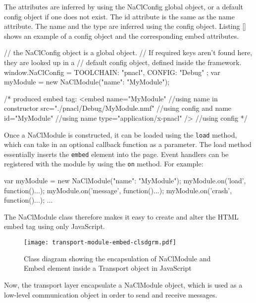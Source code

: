 The attributes are inferred by using the NaClConfig global object, or a default config object if one does not exist. The id attribute is the same as the name attribute. The name and the type are inferred using the config object. Listing \ref{} shows an example of a config object and the corresponding embed attributes.

\begin{code}
// the NaClConfig object is a global object. 
// If required keys aren't found here, they are looked up in a 
// default config object, defined inside the framework.
window.NaClConfig = {
  TOOLCHAIN: "pnacl",
  CONFIG: "Debug"
};
var myModule = new NaClModule({"name": "MyModule"});

/* produced embed tag:
<embed name="MyModule"                   //using name in constructor
       src="./pnacl/Debug/MyModule.nmf"  //using config and name
       id="MyModule"                     //using name
       type="application/x-pnacl" />     //using config
*/
\end{code}

Once a NaClModule is constructed, it can be loaded using the \lstinline{load} method, which can take in an optional callback function as a parameter. The load method essentially inserts the \lstinline{embed} element into the page. Event handlers can be registered with the module by using the \lstinline{on} method. For example:

\begin{code}
var myModule = new NaClModule({"name": "MyModule"});
myModule.on('load', function(){...});
myModule.on('message', function(){...});
myModule.on('crash', function(){...});
...
\end{code}

The NaClModule class therefore makes it easy to create and alter the HTML embed tag using only JavaScript. 

\begin{figure}
    \centering
    \texttt{[image: transport-module-embed-clsdgrm.pdf]} 
    \caption{Class diagram showing the encapsulation of NaClModule and Embed element inside a Transport object in JavaScript}
    \label{fig:naclmodule-embed}
\end{figure}

Now, the transport layer encapsulate a NaClModule object, which is used as a low-level communication object in order to send and receive messages. 


